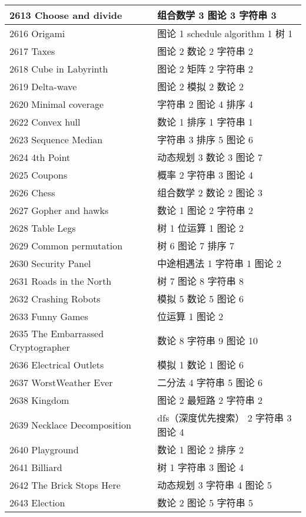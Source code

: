 \begin{longtable}{| p{} | p{} |}
 2613 Choose and divide  & 组合数学 3 图论 3 字符串 3 \\ \hline
 2616 Origami  & 图论 1 schedule algorithm 1 树 1 \\ \hline
 2617 Taxes  & 图论 2 数论 2 字符串 2 \\ \hline
 2618 Cube in Labyrinth  & 图论 2 矩阵 2 字符串 2 \\ \hline
 2619 Delta-wave  & 图论 2 模拟 2 数论 2 \\ \hline
 2620 Minimal coverage  & 字符串 2 图论 4 排序 4 \\ \hline
 2622 Convex hull  & 数论 1 排序 1 字符串 1 \\ \hline
 2623 Sequence Median  & 字符串 3 排序 5 图论 6 \\ \hline
 2624 4th Point  & 动态规划 3 数论 3 图论 7 \\ \hline
 2625 Coupons  & 概率 2 字符串 3 图论 4 \\ \hline
 2626 Chess  & 组合数学 2 数论 2 图论 3 \\ \hline
 2627 Gopher and hawks  & 数论 1 图论 2 字符串 2 \\ \hline
 2628 Table Legs  & 树 1 位运算 1 图论 2 \\ \hline
 2629 Common permutation  & 树 6 图论 7 排序 7 \\ \hline
 2630 Security Panel  & 中途相遇法 1 字符串 1 图论 2 \\ \hline
 2631 Roads in the North  & 树 7 图论 8 字符串 8 \\ \hline
 2632 Crashing Robots  & 模拟 5 数论 5 图论 6 \\ \hline
 2633 Funny Games  & 位运算 1 图论 2 \\ \hline
 2635 The Embarrassed Cryptographer  & 数论 8 字符串 9 图论 10 \\ \hline
 2636 Electrical Outlets  & 模拟 1 数论 1 图论 6 \\ \hline
 2637 WorstWeather Ever  & 二分法 4 字符串 5 图论 6 \\ \hline
 2638 Kingdom  & 图论 2 最短路 2 字符串 2 \\ \hline
 2639 Necklace Decomposition  & dfs（深度优先搜索） 2 字符串 3 图论 4 \\ \hline
 2640 Playground  & 数论 1 图论 2 排序 2 \\ \hline
 2641 Billiard  & 树 1 字符串 3 图论 4 \\ \hline
 2642 The Brick Stops Here  & 动态规划 3 字符串 4 图论 5 \\ \hline
 2643 Election  & 数论 2 图论 5 字符串 5 \\ \hline

\end{longtable}
